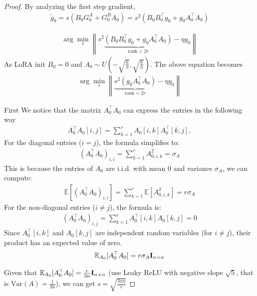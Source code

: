 \begin{proof}
By analyzing the first step gradient, 
\begin{align}
    \tilde{g}_0 = s (B_0 G^A_0 + G^B_0 A_0) = s^2 ( B_0 B^\top_0 g_0 + g_0 A^\top_0 A_0 ) 
\end{align}

\vspace{-5pt}
\begin{align}
    \arg\min_{s} \left\| s^2 \underbrace{\left( B_0 B^\top_0 g_0 + g_0 A^\top_0 A_0 \right)}_{\text{rank} < 2r} - \eta g_0 \right\|
\end{align}
As LoRA init $B_0=0$ and $A_0\sim U(-{\sqrt{\frac{6}{n}}}, {\sqrt{\frac{6}{n}}})$. The above equation becomes 
\vspace{-5pt}
\begin{align}
    \arg\min_{s} \left\| \underbrace{s^2\left( g_0 A^\top_0 A_0 \right)}_{\text{rank} < 2r} - \eta g_0 \right\| 
\end{align}

First We notice that the matrix \( A_0^\top A_0 \) can express the entries in the following way 
\begin{align}
    A_0^\top A_0[i,j] = \sum_{k=1}^r A_0[i,k] A_0^\top[k,j],
\end{align}
For the diagonal entries (\( i = j \)), the formula simplifies to:
\begin{align}
(A_0^\top A_0)_{i,i} = \sum_{k=1}^r A_{0, i, k}^2  = \sigma_A
\end{align}
This is because the entries of \( A_0 \) are i.i.d. with mean \( 0 \) and variance \( \sigma_A \), we can compute:
\begin{align}
\mathbb{E}[(A_0^\top A_0)_{i,i}] = \sum_{k=1}^r \mathbb{E}[A_{0, i, k}^2] = r \sigma_A
\end{align}
For the non-diagonal entries (\( i \neq j \)), the formula is:
\begin{align}
(A_0^\top A_0)_{i,j} = \sum_{k=1}^r A_0^\top[i, k] A_0[k, j] = 0
\end{align}
Since \( A_0^\top[i, k] \) and \( A_0[k, j] \) are independent random variables (for \( i \neq j \)), their product has an expected value of zero.
\begin{align}
\mathbb{E}_{A_0}[A_0^\top A_0] = {r} \sigma_A {\mathbf{I}}_{n \times n}
\end{align}

Given that $\mathbb{E}_{A_0}[A_0^\top A_0] = \frac{r}{3n} {\mathbf{I}}_{n \times n}$ (use Leaky ReLU with negative slope $
\sqrt{5}$, that is $\text{Var}(A) = \frac{1}{3n}$), we can get  $s = \sqrt{\frac{ 3n\eta}{r}}$


\end{proof}

